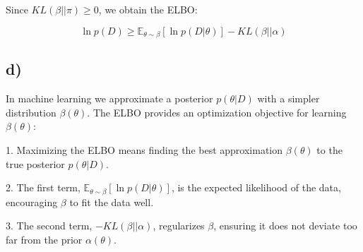 \documentclass{article}
\begin{document}
Since \( KL(\beta || \pi) \geq 0 \), we obtain the ELBO:

\[
\ln p(D) \geq \mathbb{E}_{\theta \sim \beta} [\ln p(D | \theta)] - KL(\beta || \alpha)
\]

\subsection*{d)} 
In machine learning we approximate a posterior \( p(\theta | D) \) with a simpler distribution \( \beta(\theta) \). The ELBO provides an optimization objective for learning \( \beta(\theta) \):

1. Maximizing the ELBO means finding the best approximation \( \beta(\theta) \) to the true posterior \( p(\theta | D) \).

2. The first term, \( \mathbb{E}_{\theta \sim \beta} [\ln p(D | \theta)] \), is the expected likelihood of the data, encouraging \( \beta \) to fit the data well.

3. The second term, \( -KL(\beta || \alpha) \), regularizes \( \beta \), ensuring it does not deviate too far from the prior \( \alpha(\theta) \).
\end{document}
